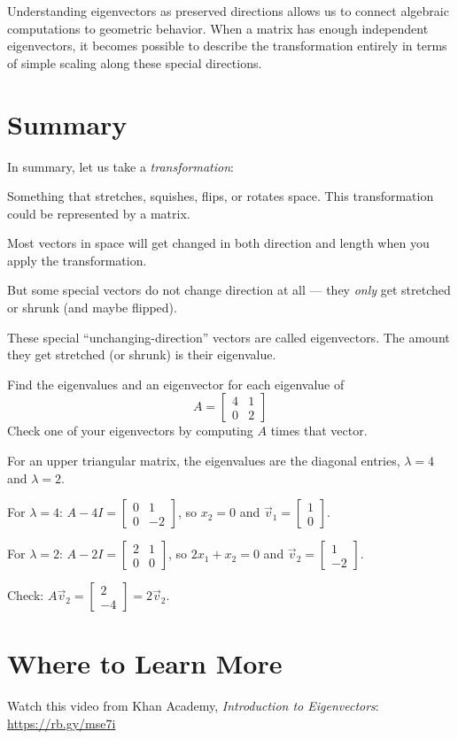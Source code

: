Understanding eigenvectors as preserved directions allows us to connect algebraic computations to geometric behavior. When a matrix has enough independent eigenvectors, it becomes possible to describe the transformation entirely in terms of simple scaling along these special directions.
\section{Summary}
In summary, let us take a \emph{transformation}:

Something that stretches, squishes, flips, or rotates space. This transformation could be represented by a matrix.

Most vectors in space will get changed in both direction and length when you apply the transformation.

But some special vectors do not change direction at all — they \emph{only} get stretched or shrunk (and maybe flipped).

These special “unchanging-direction” vectors are called eigenvectors.
The amount they get stretched (or shrunk) is their eigenvalue.

\begin{Exercise}[title={An upper triangular matrix}, label={ex:upper}]
Find the eigenvalues and an eigenvector for each eigenvalue of
$$A = \begin{bmatrix}
4 & 1 \\
0 & 2
\end{bmatrix}$$
Check one of your eigenvectors by computing $A$ times that vector.
\end{Exercise}
\begin{Answer}[ref={ex:upper}]
For an upper triangular matrix, the eigenvalues are the diagonal entries, $\lambda = 4$ and $\lambda = 2$.

For $\lambda = 4$: $A - 4I = \begin{bmatrix} 0 & 1 \\ 0 & -2 \end{bmatrix}$, so $x_2 = 0$ and $\vec{v}_1 = \begin{bmatrix} 1 \\ 0 \end{bmatrix}$.

For $\lambda = 2$: $A - 2I = \begin{bmatrix} 2 & 1 \\ 0 & 0 \end{bmatrix}$, so $2x_1 + x_2 = 0$ and $\vec{v}_2 = \begin{bmatrix} 1 \\ -2 \end{bmatrix}$.

Check: $A\vec{v}_2 = \begin{bmatrix} 2 \\ -4 \end{bmatrix} = 2\vec{v}_2$.
\end{Answer}

\section{Where to Learn More}
Watch this video from Khan Academy, \emph{Introduction to Eigenvectors}: \url{https://rb.gy/mse7i}

